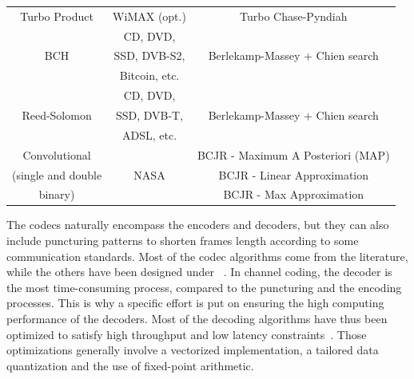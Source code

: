\begin{table}[htp]
\begin{tabular}{ c | c | c }
  \multirow{2}{*}{{Turbo Product}}        & \multirow{2}{*}{WiMAX (opt.)}       & \multirow{2}{*}{Turbo Chase-Pyndiah}   \\
                                          &                                     &                                        \\
  \hline
  \multirow{3}{*}{{BCH}}                  & CD, DVD,                            &                                        \\
                                          & SSD, DVB-S2,                        & Berlekamp-Massey + Chien search        \\
                                          & Bitcoin, etc.                       &                                        \\
  \hline
  \multirow{3}{*}{{Reed-Solomon}}         & CD, DVD,                            &                                        \\
                                          & SSD, DVB-T,                         & Berlekamp-Massey + Chien search        \\
                                          & ADSL, etc.                          &                                        \\
  \hline
  \multirow{1}{*}{{Convolutional}}        &                                     & BCJR - Maximum A Posteriori (MAP)      \\
  (single and double                      & NASA                                & BCJR - Linear Approximation            \\
  binary)                                 &                                     & BCJR - Max Approximation               \\
  \end{tabular}
\end{table}

The codecs naturally encompass the encoders and decoders, but they can also
include puncturing patterns to shorten frames length according to some
communication standards. Most of the codec algorithms come from the literature,
while the others have been designed under
\AFFECT~\cite{Tonnellier2016a,Tonnellier2016b,Tonnellier2017,Leonardon2019}.
In channel coding, the decoder is the most time-consuming process, compared to
the puncturing and the encoding processes. This is why a specific effort is put
on ensuring the high computing performance of the decoders. Most of the decoding
algorithms have thus been optimized to satisfy high throughput and low latency
constraints~\cite{LeGal2015a,Cassagne2015c,Cassagne2016a,Cassagne2016b}. Those
optimizations generally involve a vectorized implementation, a tailored data
quantization and the use of fixed-point arithmetic.

